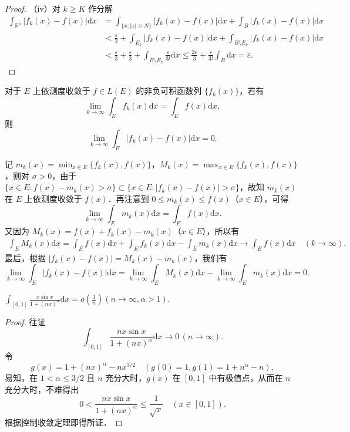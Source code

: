 \documentclass[../../main.tex]{subfiles}%
\begin{document}
\begin{proof}
（iv）对 \( k \geqslant K \) 作分解
\begin{align*}
\int_{\mathbb{R}^n} |f_k(x) - f(x)| \mathrm{d}x &= \int_{\{ x : |x| \geqslant N \}} |f_k(x) - f(x)| \mathrm{d}x + \int_{B} |f_k(x) - f(x)| \mathrm{d}x \\
&< \frac{\varepsilon}{3} + \int_{E_k} |f_k(x) - f(x)| \mathrm{d}x + \int_{B \setminus E_k} |f_k(x) - f(x)| \mathrm{d}x \\
&< \frac{\varepsilon}{3} + \frac{\varepsilon}{3} + \int_{B \setminus E_k} \frac{\varepsilon}{3l} \mathrm{d}x \leqslant \frac{2\varepsilon}{3} + \frac{\varepsilon}{3l} \int_{B} \mathrm{d}x = \varepsilon.
\end{align*}

\end{proof}
\begin{remark}
对于 \( E \) 上依测度收敛于 \( f \in L(E) \) 的非负可积函数列 \( \{ f_k(x) \} \)，若有
\[
\lim_{k \to \infty} \int_E f_k(x) \mathrm{d}x = \int_E f(x) \mathrm{d}x,
\]
则
\[
\lim_{k \to \infty} \int_E |f_k(x) - f(x)| \mathrm{d}x = 0.
\]

记 \( m_k(x) = \min_{x \in E} \{ f_k(x), f(x) \} \)，\( M_k(x) = \max_{x \in E} \{ f_k(x), f(x) \} \)，则对 \( \sigma > 0 \)，由于 \( \{ x \in E : f(x) - m_k(x) > \sigma \} \subset \{ x \in E : |f_k(x) - f(x)| > \sigma \} \)，故知 \( m_k(x) \) 在 \( E \) 上依测度收敛于 \( f(x) \)．再注意到 \( 0 \leqslant m_k(x) \leqslant f(x) \)（\( x \in E \)），可得
\[
\lim_{k \to \infty} \int_E m_k(x) \mathrm{d}x = \int_E f(x) \mathrm{d}x.
\]
又因为 \( M_k(x) = f(x) + f_k(x) - m_k(x) \)（\( x \in E \)），所以有
\begin{align*}
\int_E M_k(x) \mathrm{d}x = \int_E f(x) \mathrm{d}x + \int_E f_k(x) \mathrm{d}x - \int_E m_k(x) \mathrm{d}x 
\to \int_E f(x) \mathrm{d}x \quad (k \to \infty).
\end{align*}
最后，根据 \( |f_k(x) - f(x)| = M_k(x) - m_k(x) \)，我们有
\[
\lim_{k \to \infty} \int_E |f_k(x) - f(x)| \mathrm{d}x = \lim_{k \to \infty} \int_E M_k(x) \mathrm{d}x - \lim_{k \to \infty} \int_E m_k(x) \mathrm{d}x = 0.
\]
\end{remark}

\begin{example}
$\int_{[0,1]} \frac{x\sin x}{1 + (nx)^\alpha} \mathrm{d}x = o\left( \frac{1}{n} \right) (n \to \infty, \alpha > 1).$
\end{example}
\begin{proof}

往证
\[
\int_{[0,1]} \frac{nx\sin x}{1 + (nx)^\alpha} \mathrm{d}x \to 0 \, (n \to \infty).
\]
令
\[
g(x) = 1 + (nx)^\alpha - nx^{3/2} \quad (g(0) = 1, g(1) = 1 + n^\alpha - n),
\]
易知，在 \(1 < \alpha \leqslant 3/2\) 且 \(n\) 充分大时，\(g(x)\) 在 \([0,1]\) 中有极值点，从而在 \(n\) 充分大时，不难得出
\[
0 < \frac{nx\sin x}{1 + (nx)^\alpha} \leqslant \frac{1}{\sqrt{x}} \quad (x \in [0,1]).
\]
根据控制收敛定理即得所证．

\end{proof}
\end{document}
